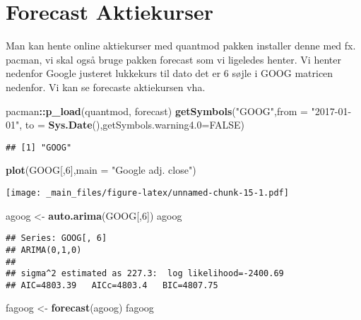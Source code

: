 \documentclass[]{book}
\newenvironment{Shaded}{\begin{snugshade}}{\end{snugshade}}
\newcommand{\DataTypeTok}[1]{\textcolor[rgb]{0.13,0.29,0.53}{#1}}
\newcommand{\DecValTok}[1]{\textcolor[rgb]{0.00,0.00,0.81}{#1}}
\newcommand{\KeywordTok}[1]{\textcolor[rgb]{0.13,0.29,0.53}{\textbf{#1}}}
\newcommand{\NormalTok}[1]{#1}
\newcommand{\OperatorTok}[1]{\textcolor[rgb]{0.81,0.36,0.00}{\textbf{#1}}}
\newcommand{\OtherTok}[1]{\textcolor[rgb]{0.56,0.35,0.01}{#1}}
\newcommand{\StringTok}[1]{\textcolor[rgb]{0.31,0.60,0.02}{#1}}
\begin{document}
\hypertarget{forecast-aktiekurser}{%
\section{Forecast Aktiekurser}\label{forecast-aktiekurser}}

Man kan hente online aktiekurser med quantmod pakken installer denne med fx. pacman, vi skal også bruge pakken forecast som vi ligeledes henter. Vi henter nedenfor Google justeret lukkekurs til dato det er 6 søjle i GOOG matricen nedenfor. Vi kan se forecaste aktiekursen vha.

\begin{Shaded}
\begin{Highlighting}[]
\NormalTok{pacman}\OperatorTok{::}\KeywordTok{p_load}\NormalTok{(quantmod, forecast)}
\KeywordTok{getSymbols}\NormalTok{(}\StringTok{"GOOG"}\NormalTok{,}\DataTypeTok{from =} \StringTok{"2017-01-01"}\NormalTok{, }\DataTypeTok{to =} \KeywordTok{Sys.Date}\NormalTok{(),}\DataTypeTok{getSymbols.warning4.0=}\OtherTok{FALSE}\NormalTok{)}
\end{Highlighting}
\end{Shaded}

\begin{verbatim}
## [1] "GOOG"
\end{verbatim}

\begin{Shaded}
\begin{Highlighting}[]
\KeywordTok{plot}\NormalTok{(GOOG[,}\DecValTok{6}\NormalTok{],}\DataTypeTok{main =} \StringTok{"Google adj. close"}\NormalTok{)}
\end{Highlighting}
\end{Shaded}

\texttt{[image: \_main\_files/figure-latex/unnamed-chunk-15-1.pdf]}

\begin{Shaded}
\begin{Highlighting}[]
\NormalTok{agoog <-}\StringTok{ }\KeywordTok{auto.arima}\NormalTok{(GOOG[,}\DecValTok{6}\NormalTok{])}
\NormalTok{agoog}
\end{Highlighting}
\end{Shaded}

\begin{verbatim}
## Series: GOOG[, 6] 
## ARIMA(0,1,0) 
## 
## sigma^2 estimated as 227.3:  log likelihood=-2400.69
## AIC=4803.39   AICc=4803.4   BIC=4807.75
\end{verbatim}

\begin{Shaded}
\begin{Highlighting}[]
\NormalTok{fagoog <-}\StringTok{ }\KeywordTok{forecast}\NormalTok{(agoog)}
\NormalTok{fagoog}
\end{Highlighting}
\end{Shaded}
\end{document}
